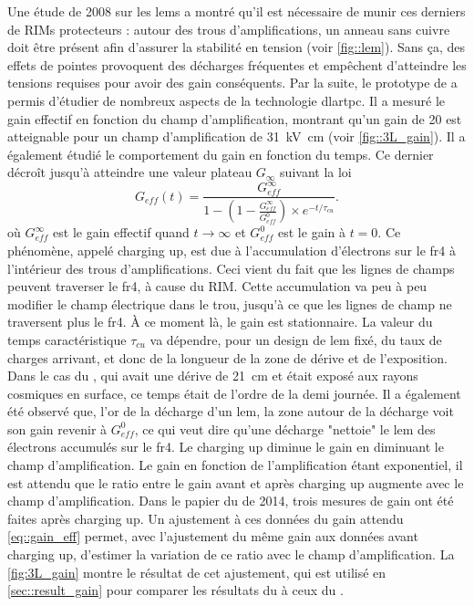       Une étude de 2008 sur les \glspl{lem}\cite{Breskin2008} a montré qu'il est nécessaire de munir ces derniers de RIMs protecteurs : autour des trous d'amplifications, un anneau sans cuivre doit être présent afin d'assurer la stabilité en tension (voir \autoref{fig::lem}). Sans ça, des effets de pointes provoquent des décharges fréquentes et empêchent d'atteindre les tensions requises pour avoir des gain conséquents. Par la suite, le prototype de \threeL{}\cite{Cantini2013,Cantini2014} a permis d'étudier de nombreux aspects de la technologie \gls{dlartpc}. Il a mesuré le gain effectif en fonction du champ d'amplification, montrant qu'un gain de 20 est atteignable pour un champ d'amplification de \SI{31}{\kilo\volt\centi\meter} (voir \autoref{fig::3L_gain}). Il a également étudié le comportement du gain en fonction du temps. Ce dernier décroît jusqu'à atteindre une valeur plateau $G_{\infty}$ suivant la loi
      \begin{equation}
        G_{eff}(t) = \frac{G_{eff}^{\infty}}{1-(1-\frac{G_{eff}^{\infty}}{G_{eff}^0})\times e^{-t/\tau_{cu}}}.
      \end{equation}
      où $G_{eff}^{\infty}$ est le gain effectif quand $t\to\infty$ et $G_{eff}^0$ est le gain à $t=0$. Ce phénomène, appelé charging up, est due à l'accumulation d'électrons sur le \gls{fr4} à l'intérieur des trous d'amplifications. Ceci vient du fait que les lignes de champs peuvent traverser le \gls{fr4}, à cause du RIM. Cette accumulation va peu à peu modifier le champ électrique dans le trou, jusqu'à ce que les lignes de champ ne traversent plus le \gls{fr4}. À ce moment là, le gain est stationnaire. La valeur du temps caractéristique $\tau_{cu}$ va dépendre, pour un design de \gls{lem} fixé, du taux de charges arrivant, et donc de la longueur de la zone de dérive et de l'exposition. Dans le cas du \threeL{}, qui avait une dérive de \SI{21}{\centi\meter} et était exposé aux rayons cosmiques en surface, ce temps était de l'ordre de la demi journée. Il a également été observé que, l'or de la décharge d'un \gls{lem}, la zone autour de la décharge voit son gain revenir à $G_{eff}^0$, ce qui veut dire qu'une décharge "nettoie" le \gls{lem} des électrons accumulés sur le \gls{fr4}.  Le charging up diminue le gain en diminuant le champ d'amplification. Le gain en fonction de l'amplification étant exponentiel, il est attendu que le ratio entre le gain avant et après charging up augmente avec le champ d'amplification. Dans le papier du \threeL{} de 2014, trois mesures de gain ont été faites après charging up. Un ajustement à ces données du gain attendu \eqref{eq::gain_eff} permet, avec l'ajustement du même gain aux données avant charging up, d'estimer la variation de ce ratio avec le champ d'amplification. La \autoref{fig:3L_gain} montre le résultat de cet ajustement, qui est utilisé en \autoref{sec::result_gain} pour comparer les résultats du \TOO{} à ceux du \threeL{}.

